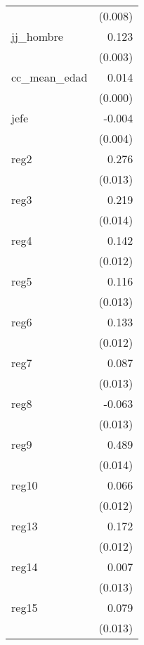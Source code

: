 {\begin{longtable}{l*{1}{D{.}{.}{-1}}}
            &     (0.008)         \\
\addlinespace
jj\_hombre   &       0.123\sym{***}\\
            &     (0.003)         \\
\addlinespace
cc\_mean\_edad&       0.014\sym{***}\\
            &     (0.000)         \\
\addlinespace
jefe        &      -0.004         \\
            &     (0.004)         \\
\addlinespace
reg2        &       0.276\sym{***}\\
            &     (0.013)         \\
\addlinespace
reg3        &       0.219\sym{***}\\
            &     (0.014)         \\
\addlinespace
reg4        &       0.142\sym{***}\\
            &     (0.012)         \\
\addlinespace
reg5        &       0.116\sym{***}\\
            &     (0.013)         \\
\addlinespace
reg6        &       0.133\sym{***}\\
            &     (0.012)         \\
\addlinespace
reg7        &       0.087\sym{***}\\
            &     (0.013)         \\
\addlinespace
reg8        &      -0.063\sym{***}\\
            &     (0.013)         \\
\addlinespace
reg9        &       0.489\sym{***}\\
            &     (0.014)         \\
\addlinespace
reg10       &       0.066\sym{***}\\
            &     (0.012)         \\
\addlinespace
reg13       &       0.172\sym{***}\\
            &     (0.012)         \\
\addlinespace
reg14       &       0.007         \\
            &     (0.013)         \\
\addlinespace
reg15       &       0.079\sym{***}\\
            &     (0.013)         \\

\end{longtable}}
